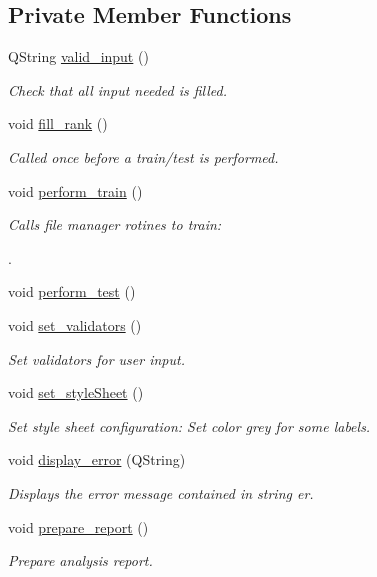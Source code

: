 \subsection*{Private Member Functions}
\begin{DoxyCompactItemize}
\item 
Q\-String \hyperlink{a00002_a5ec9d8a051303b218c4542f96a87b56f}{valid\-\_\-input} ()
\begin{DoxyCompactList}\small\item\em Check that all input needed is filled. \end{DoxyCompactList}\item 
void \hyperlink{a00002_a8e8c5918a3a0ddfd352c62e7348d3d74}{fill\-\_\-rank} ()
\begin{DoxyCompactList}\small\item\em Called once before a train/test is performed. \end{DoxyCompactList}\item 
void \hyperlink{a00002_ad1bb069dee02010a61045c91f5e7752f}{perform\-\_\-train} ()
\begin{DoxyCompactList}\small\item\em Calls file manager rotines to train\-:\par
. \end{DoxyCompactList}\item 
void \hyperlink{a00002_ade6ba53055965b3522fa3cd022e4c5e0}{perform\-\_\-test} ()
\item 
void \hyperlink{a00002_abd9fac4d8ad5334cc48afb0513544898}{set\-\_\-validators} ()
\begin{DoxyCompactList}\small\item\em Set validators for user input. \end{DoxyCompactList}\item 
void \hyperlink{a00002_a5683a1862ec1a85cf87d9c5f6fc528e9}{set\-\_\-style\-Sheet} ()
\begin{DoxyCompactList}\small\item\em Set style sheet configuration\-: Set color grey for some labels. \end{DoxyCompactList}\item 
void \hyperlink{a00002_a69ac504cf1500a8c6283d8721b09aeb2}{display\-\_\-error} (Q\-String)
\begin{DoxyCompactList}\small\item\em Displays the error message contained in string er. \end{DoxyCompactList}\item 
void \hyperlink{a00002_a4b4725862e2fb5a2ffd6ebc0a88c096c}{prepare\-\_\-report} ()
\begin{DoxyCompactList}\small\item\em Prepare analysis report. \end{DoxyCompactList}\end{DoxyCompactItemize}
